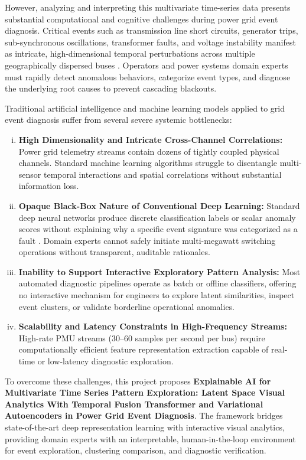 \documentclass[12pt,a4paper]{report}
\begin{document}
However, analyzing and interpreting this multivariate time-series data presents substantial computational and cognitive challenges during power grid event diagnosis. Critical events such as transmission line short circuits, generator trips, sub-synchronous oscillations, transformer faults, and voltage instability manifest as intricate, high-dimensional temporal perturbations across multiple geographically dispersed buses \cite{ref_rivas2020_faults}. Operators and power systems domain experts must rapidly detect anomalous behaviors, categorize event types, and diagnose the underlying root causes to prevent cascading blackouts.

Traditional artificial intelligence and machine learning models applied to grid event diagnosis suffer from several severe systemic bottlenecks:
\begin{enumerate}[(i)]
    \item \textbf{High Dimensionality and Intricate Cross-Channel Correlations:} Power grid telemetry streams contain dozens of tightly coupled physical channels. Standard machine learning algorithms struggle to disentangle multi-sensor temporal interactions and spatial correlations without substantial information loss.
    \item \textbf{Opaque Black-Box Nature of Conventional Deep Learning:} Standard deep neural networks produce discrete classification labels or scalar anomaly scores without explaining why a specific event signature was categorized as a fault \cite{ref_arrieta2020_xai}. Domain experts cannot safely initiate multi-megawatt switching operations without transparent, auditable rationales.
    \item \textbf{Inability to Support Interactive Exploratory Pattern Analysis:} Most automated diagnostic pipelines operate as batch or offline classifiers, offering no interactive mechanism for engineers to explore latent similarities, inspect event clusters, or validate borderline operational anomalies.
    \item \textbf{Scalability and Latency Constraints in High-Frequency Streams:} High-rate PMU streams (30--60 samples per second per bus) require computationally efficient feature representation extraction capable of real-time or low-latency diagnostic exploration.
\end{enumerate}

To overcome these challenges, this project proposes \textbf{Explainable AI for Multivariate Time Series Pattern Exploration: Latent Space Visual Analytics With Temporal Fusion Transformer and Variational Autoencoders in Power Grid Event Diagnosis}. The framework bridges state-of-the-art deep representation learning with interactive visual analytics, providing domain experts with an interpretable, human-in-the-loop environment for event exploration, clustering comparison, and diagnostic verification.
\end{document}
